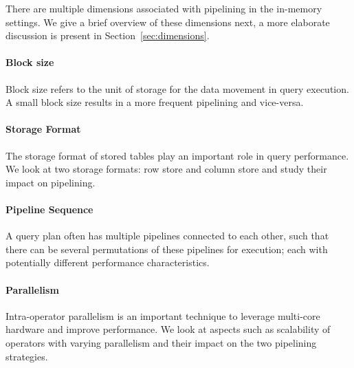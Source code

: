 There are multiple dimensions associated with pipelining in the in-memory settings.
We give a brief overview of these dimensions next, a more elaborate discussion is present in Section~\ref{sec:dimensions}.
\paragraph*{{\bf Block size}}
Block size refers to the unit of storage for the data movement in query execution. 
A small block size results in a more frequent pipelining and vice-versa.

\paragraph*{\textbf{Storage Format}}
The storage format of stored tables play an important role in query performance. 
We look at two storage formats: row store and column store and study their impact on pipelining. %


\paragraph*{\textbf{Pipeline Sequence}}
A query plan often has multiple pipelines connected to each other, such that there can be several permutations of these pipelines for execution; each with potentially different performance characteristics. 

\paragraph*{\bf{Parallelism}} 
Intra-operator parallelism is an important technique to leverage multi-core hardware and improve performance.
We look at aspects such as scalability of operators with varying parallelism and their impact on the two pipelining strategies.

